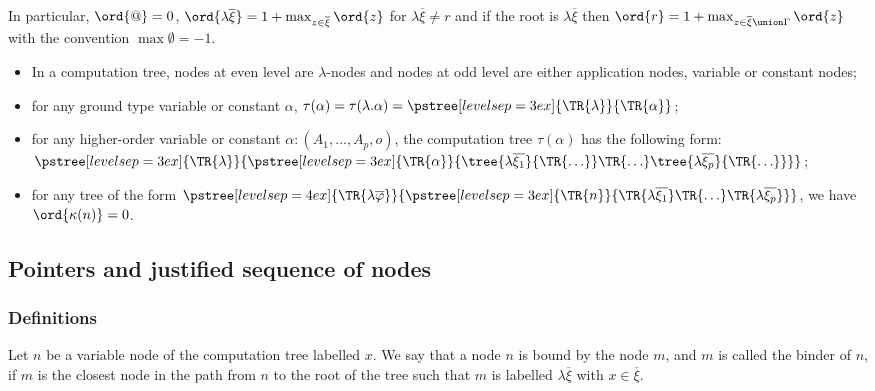 In particular, $\ord{@} = 0$, $\ord{\lambda \overline{\xi}} = 1+
\max_{z\in \overline{\xi}} \ord{z}$ for $\lambda \overline{\xi}\neq
r$ and if the root is $\lambda \overline{\xi}$ then $\ord{r} = 1 + \max_{z\in
\overline{\xi}\union \Gamma} \ord{z}$ with the convention $\max
\emptyset = -1$.

\begin{remark} \hfill
\begin{itemize}
\item In a computation tree, nodes at even level are $\lambda$-nodes and nodes at odd level are either application nodes,
variable or constant nodes;

\item for any ground type variable or constant $\alpha$,
$\tau(\alpha) = \tau(\lambda . \alpha) =  \pstree[levelsep=3ex]
    { \TR{\lambda } }
    { \TR{\alpha}
    }$;

\item for any higher-order variable or constant $\alpha : (A_1,\ldots,A_p,o)$, the computation tree $\tau(\alpha)$ has the following form:
$ \pstree[levelsep=3ex]{\TR{\lambda}}
        {\pstree[levelsep=3ex]
                { \TR{\alpha} }
                { \tree{\lambda \overline{\xi_1}}{\TR{\ldots}} \TR{\ldots} \tree{\lambda \overline{\xi_p}}{\TR{\ldots}}
                }
        }
$;

\item for any tree of the form
        $ \pstree[levelsep=4ex]
            { \TR{\lambda \overline{\varphi}} }
            { \pstree[levelsep=3ex]
                {\TR{n}}
                {\TR{\lambda \overline{\xi_1}} \TR{\ldots} \TR{\lambda \overline{\xi_p}}}
            }
        $,
    we have $\ord{\kappa(n)}=0$.

\end{itemize}
\end{remark}


\subsection{Pointers and justified sequence of nodes}
\subsubsection{Definitions}
\begin{definition}[Binder]
Let $n$ be a variable node of the computation tree labelled $x$. We
say that a node $n$ is bound by the node $m$, and $m$ is called the
binder of $n$, if $m$ is the closest node in the path from $n$ to
the root of the tree such that $m$ is labelled $\lambda
\overline{\xi}$ with $x\in \overline{\xi}$.
\end{definition}

